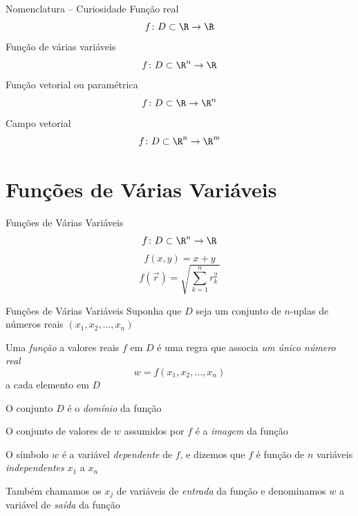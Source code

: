 \begin{frame}{Nomenclatura -- Curiosidade}
  Função real
  \[
    f\colon D \subset \R \to \R
  \]
  \pause
  Função de várias variáveis
  \[
    f\colon D \subset \R^n \to \R
  \]
  \pause
  Função vetorial ou paramétrica
  \[
    f\colon D \subset \R \to \R^n
  \]
  \pause
  Campo vetorial
  \[
    f\colon D \subset \R^n \to \R^m
  \]
\end{frame}

\section{Funções de Várias Variáveis}

\begin{frame}{Funções de Várias Variáveis}
  \[
    f\colon D \subset \R^n \to \R
  \]
  \pause
  \[
    f(x, y) = x + y
  \]
  \pause
  \[
    f(\vec{r}) = \sqrt{\sum_{k=1}^n r_k^2\,}
  \]
\end{frame}

\begin{frame}{Funções de Várias Variáveis}
  Suponha que $D$ seja um conjunto  de $n$-uplas de números reais
  \((x_1, x_2, \dots, x_n)\)

  \pause
  Uma \emph{função} a valores reais $f$ em $D$ é uma regra que associa
  \emph{um único número real}
  \[
    w = f(x_1, x_2, \dots, x_n)
  \]
  a cada elemento em $D$

  \pause
  O conjunto $D$ é o \emph{domínio} da função

  \pause
  O conjunto de valores de $w$ assumidos por $f$ é a \emph{imagem} da função

  \pause
  O símbolo $w$ é a variável \emph{dependente} de $f$, e dizemos que $f$
  é função de $n$ variáveis \emph{independentes} $x_1$ a $x_n$

  \pause
  Também chamamos os $x_j$ de variáveis de \emph{entrada} da função e
  denominamos $w$ a variável de \emph{saída} da função
\end{frame}



